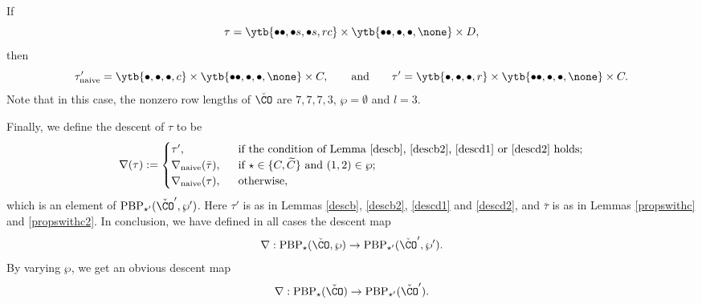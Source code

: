 \documentclass[ssunip]{subfiles}
\begin{document}
\begin{Example}
 If 
 \[
 \tau= \ytb{\bullet\bullet, \bullet s, \bullet s, r c} \times \ytb{\bullet\bullet,\bullet,\bullet, \none }\times 
  D,
 \]
 then 
\[
 \tau'_{\mathrm{naive}}=\ytb{\bullet, \bullet , \bullet ,  c} \times \ytb{\bullet\bullet,\bullet,\bullet, \none } \times 
  C,\qquad\textrm{and}\qquad \tau'=\ytb{\bullet, \bullet , \bullet ,  r} \times \ytb{\bullet\bullet,\bullet,\bullet, \none } \times
  C.
 \]
 Note that in this case, the nonzero row lengths of $\check \CO$ are $7,7,7,3$,  $\wp=\emptyset$ and $l=3$.
\end{Example}

Finally, we define the descent of $\tau$ to be 
\[
  \nabla(\tau):= \begin{cases}
  \tau', & \ \text{ if the condition of Lemma \ref{descb}, \ref{descb2}, \ref{descd1} or \ref{descd2} holds}; \\
  \nabla_{\mathrm{naive}}(\bar \tau), &\  \text{ if $\star\in \{C,\widetilde C\}$ and $(1,2)\in \wp$;}\\
  \nabla_{\mathrm{naive}}( \tau), & \ \text{ otherwise},
\end{cases}
\]
which is an element of $  \mathrm{PBP}_{\star'}(\check \CO',\wp')$. 
Here $\tau'$ is as in Lemmas \ref{descb}, \ref{descb2}, \ref{descd1} and \ref{descd2}, and $\bar \tau$ is as in Lemmas \ref{propswithc} and \ref{propswithc2}. In conclusion, we have defined in all cases the descent map
\[
\nabla: \mathrm{PBP}_{\star}(\check \CO,\wp)\rightarrow \mathrm{PBP}_{\star'}(\check \CO',\wp').
\]
By varying $\wp$, we get an obvious descent map
\[
\nabla: \mathrm{PBP}_{\star}(\check \CO)\rightarrow \mathrm{PBP}_{\star'}(\check \CO').
\]
\end{document}
